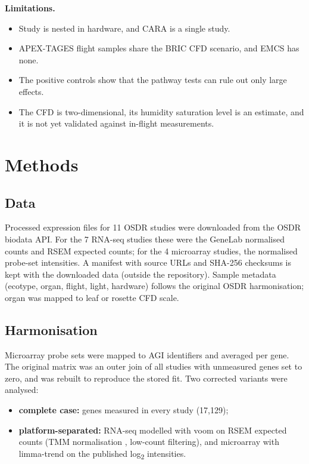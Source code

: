 \documentclass[11pt,a4paper]{article}
\begin{document}
\textbf{Limitations.}
\begin{itemize}
    \item Study is nested in hardware, and CARA is a single study.
    \item APEX-TAGES flight samples share the BRIC CFD scenario, and EMCS has none.
    \item The positive controls show that the pathway tests can rule out only large effects.
    \item The CFD is two-dimensional, its humidity saturation level is an estimate, and it is not yet validated against in-flight measurements.
\end{itemize}

\section*{Methods}

\subsection*{Data}

Processed expression files for 11 OSDR studies were downloaded from the OSDR biodata API. For the 7 RNA-seq studies these were the GeneLab normalised counts and RSEM expected counts; for the 4 microarray studies, the normalised probe-set intensities. A manifest with source URLs and SHA-256 checksums is kept with the downloaded data (outside the repository). Sample metadata (ecotype, organ, flight, light, hardware) follows the original OSDR harmonisation; organ was mapped to leaf or rosette CFD scale.

\subsection*{Harmonisation}

Microarray probe sets were mapped to AGI identifiers and averaged per gene. The original matrix was an outer join of all studies with unmeasured genes set to zero, and was rebuilt to reproduce the stored fit. Two corrected variants were analysed:
\begin{itemize}
    \item \textbf{complete case:} genes measured in every study (17,129);
    \item \textbf{platform-separated:} RNA-seq modelled with voom on RSEM expected counts (TMM normalisation \citep{robinson2010}, low-count filtering), and microarray with limma-trend on the published log\textsubscript{2} intensities.
\end{itemize}
\end{document}
